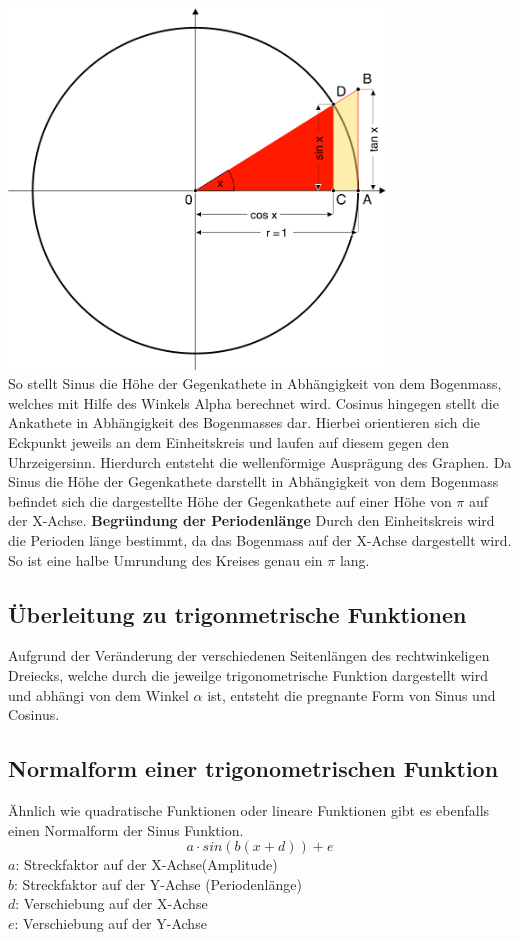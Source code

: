 \includegraphics[width=10cm]{Media/Winkelfunktionen_Einheitskreis}\\
So stellt Sinus die Höhe der Gegenkathete in Abhängigkeit von dem Bogenmass, welches mit Hilfe des
Winkels Alpha berechnet wird. Cosinus hingegen stellt die Ankathete in Abhängigkeit des Bogenmasses dar. Hierbei orientieren sich die Eckpunkt jeweils an dem Einheitskreis und laufen auf 
diesem gegen den Uhrzeigersinn. Hierdurch entsteht die wellenförmige Ausprägung des Graphen. Da Sinus die Höhe der Gegenkathete darstellt in Abhängigkeit von dem Bogenmass befindet sich die
dargestellte Höhe der Gegenkathete auf einer Höhe von $\pi$ auf der X-Achse. 
\textbf{Begründung der Periodenlänge}
Durch den Einheitskreis wird die Perioden länge bestimmt, da das Bogenmass auf der X-Achse dargestellt wird. So ist eine halbe Umrundung des Kreises genau ein $\pi$ lang. 


\subsection{Überleitung zu trigonmetrische Funktionen}\label{sec:Trigonometrie/Ueberleitung zu trigonometrischen Funktionen}
Aufgrund der Veränderung der verschiedenen Seitenlängen des rechtwinkeligen Dreiecks, welche durch die jeweilge trigonometrische Funktion dargestellt wird und abhängi
von dem Winkel $\alpha$ ist, entsteht die pregnante Form von Sinus und Cosinus. 
\\


\subsection{Normalform einer trigonometrischen Funktion}\label{sec:Trigonometrie/Normalform einer trigonometrischen Funktion}
Ähnlich wie quadratische Funktionen oder lineare Funktionen gibt es ebenfalls einen Normalform der Sinus Funktion.
\[a\cdot sin(b(x+d))+e\]
$a$: Streckfaktor auf der X-Achse(Amplitude) \\
$b$: Streckfaktor auf der Y-Achse (Periodenlänge)\\
$d$: Verschiebung auf der X-Achse\\
$e$: Verschiebung auf der Y-Achse \\
	\pagebreak
	
